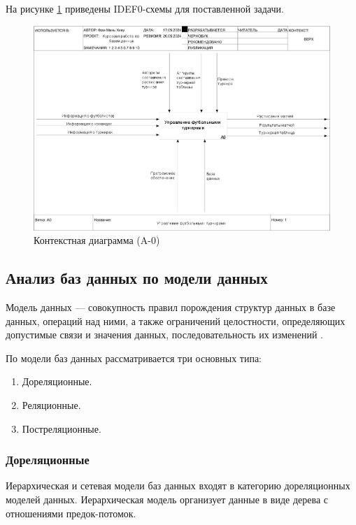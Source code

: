 На рисунке \ref{img:A0} приведены IDEF0-схемы для поставленной задачи.
\begin{figure}[h]
	\centering
	\includegraphics[height=0.45\textheight]{img/idef0/01_A0.png}
	\caption{Контекстная диаграмма (A-0)}
	\label{img:A0}
\end{figure}

\subsection{Анализ баз данных по модели данных}
Модель данных --- совокупность правил порождения структур данных в базе данных, операций над ними, а также ограничений целостности, определяющих допустимые связи и значения данных, последовательность их изменений \cite{roders}.

По модели баз данных рассматривается три основных типа:
\begin{enumerate}
	\item Дореляционные.
	\item Реляционные.
	\item Постреляционные.
\end{enumerate}
\subsubsection{Дореляционные}
Иерархическая и сетевая модели баз данных входят в категорию дореляционных моделей данных.
Иерархическая модель организует данные в виде дерева с отношениями предок-потомок.

